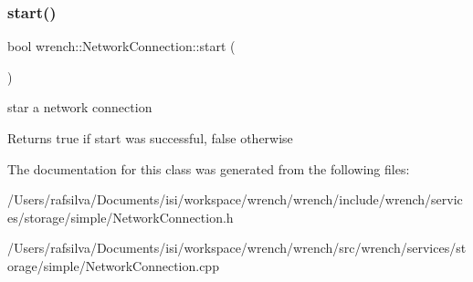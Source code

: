 \subsubsection{\texorpdfstring{start()}{start()}}
{\footnotesize\ttfamily bool wrench\+::\+Network\+Connection\+::start (\begin{DoxyParamCaption}{ }\end{DoxyParamCaption})}



star a network connection 

\begin{DoxyReturn}{Returns}
true if start was successful, false otherwise 
\end{DoxyReturn}


The documentation for this class was generated from the following files\+:\begin{DoxyCompactItemize}
\item 
/\+Users/rafsilva/\+Documents/isi/workspace/wrench/wrench/include/wrench/services/storage/simple/Network\+Connection.\+h\item 
/\+Users/rafsilva/\+Documents/isi/workspace/wrench/wrench/src/wrench/services/storage/simple/Network\+Connection.\+cpp\end{DoxyCompactItemize}
